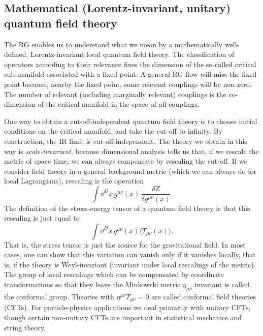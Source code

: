 \subsection{Mathematical (Lorentz-invariant, unitary) quantum field theory}

The RG enables us to understand what we mean by a mathematically well-defined,
Lorentz-invariant local quantum field theory. The classification of operators
according to their relevance fixes the dimension of the so-called critical
sub-manifold associated with a fixed point. A general RG flow will miss the fixed
point because, nearby the fixed point, some relevant couplings will be non-zero.
The number of relevant (including marginally relevant) couplings is the
co-dimension of the critical manifold in the space of all couplings.

One way to obtain a cut-off-independent quantum field theory is to choose initial
conditions on the critical manifold, and take the cut-off to infinity. By
construction, the IR limit is cut-off-independent. The theory we obtain in this
way is \emph{scale-invariant}, because dimensional analysis tells us that, if we rescale
the metric of space-time, we can always compensate by rescaling the cut-off. If we
consider field theory in a general background metric (which we can always do for
local Lagrangians), rescaling is the operation
\[
  \int \dd^{D}x\,g^{\mu\nu}(x)\,
  \frac{\delta Z}{\delta g^{\mu\nu}(x)}.
\]
The definition of the stress-energy tensor of a quantum field theory is that this
rescaling is just equal to
\[
  \int \dd^{D}x\,g^{\mu\nu}(x)\langle T_{\mu\nu}(x)\rangle.
\]
That is, the stress tensor is just the source for the gravitational field. In most
cases, one can show that this variation can vanish only if it vanishes locally,
that is, if the theory is Weyl-invariant (invariant under local rescalings of the
metric). The group of local rescalings which can be compensated by coordinate
transformations so that they leave the Minkowski metric $\eta_{\mu\nu}$ invariant
is called the conformal group. Theories with $\eta^{\mu\nu}T_{\mu\nu}=0$ are
called conformal field theories (CFTs). For particle-physics applications we deal
primarily with unitary CFTs, though certain non-unitary CFTs are important in
statistical mechanics and string theory.


